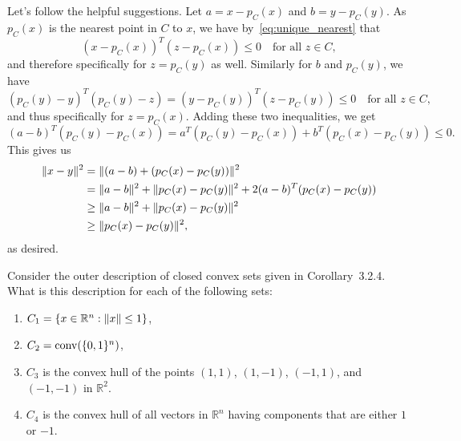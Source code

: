 \begin{solution}
  Let's follow the helpful suggestions.
  Let $a = x - p_C(x)$ and $b = y - p_C(y)$.
  As $p_C(x)$ is the nearest point in $C$ to $x$, we have by~\eqref{eq:unique_nearest} that
  \begin{equation}
    (x - p_C(x))^T (z - p_C(x)) \leq 0 \quad \text{for all } z \in C,
  \end{equation}
  and therefore specifically for $z = p_C(y)$ as well.
  Similarly for $b$ and $p_C(y)$, we have
  \begin{equation}
    (p_C(y) - y)^T (p_C(y) - z) = (y - p_C(y))^T (z - p_C(y)) \leq 0 \quad \text{for all } z \in C,
  \end{equation}
  and thus specifically for $z = p_C(x)$.
  Adding these two inequalities, we get
  \begin{equation}
    (a - b)^T (p_C(y) - p_C(x)) = a^T (p_C(y) - p_C(x)) + b^T (p_C(x) - p_C(y)) \leq 0.
  \end{equation}
  This gives us
  \begin{equation}
    \begin{split}
      \lVert x - y\rVert^2 &= \lVert(a - b) + (p_C(x) - p_C(y))\rVert^2 \\
      &= \lVert a - b\rVert^2 + \lVert p_C(x) - p_C(y)\rVert^2 + 2 (a - b)^T (p_C(x) - p_C(y)) \\
      &\geq \lVert a - b\rVert^2 + \lVert p_C(x) - p_C(y)\rVert^2 \\
      &\geq \lVert p_C(x) - p_C(y)\rVert^2,
    \end{split}
  \end{equation}
  as desired.
\end{solution}

\begin{exercise}
  Consider the outer description of closed convex sets given in Corollary~3.2.4.
  What is this description for each of the following sets:
  \begin{enumerate}[label = (\emph{\roman*})]
    \item $C_1 = \{ x \in \mathbb{R}^n : \lVert x\rVert \leq 1 \}$,
    \item $C_2 = \operatorname*{conv}(\{0, 1\}^n)$,
    \item $C_3$ is the convex hull of the points $(1,1)$, $(1,-1)$, $(-1,1)$, and $(-1,-1)$ in $\mathbb{R}^2$.
    \item $C_4$ is the convex hull of all vectors in $\mathbb{R}^n$ having components that are either $1$ or $-1$.
  \end{enumerate}
\end{exercise}

